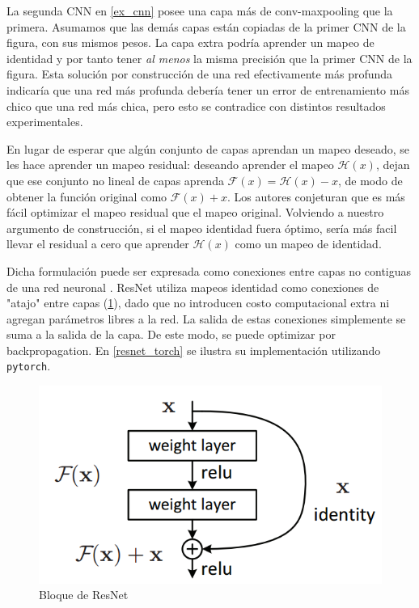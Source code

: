 \documentclass[titlepage,a4paper,oneside]{article}
\begin{document}
La segunda CNN en \ref{ex_cnn} posee una capa más de conv-maxpooling que la primera. Asumamos que las demás capas están copiadas de la primer CNN de la figura, con sus mismos pesos. La capa extra podría aprender un mapeo de identidad y por tanto tener \textit{al menos} la misma precisión que la primer CNN de la figura. Esta solución por construcción de una red efectivamente más profunda indicaría que una red más profunda debería tener un error de entrenamiento más chico que una red más chica, pero esto se contradice con distintos resultados experimentales.

En lugar de esperar que algún conjunto de capas aprendan un mapeo deseado, se les hace aprender un mapeo residual: deseando aprender el mapeo $\mathscr{H}(x)$, dejan que ese conjunto no lineal de capas aprenda $\mathscr{F}(x) = \mathscr{H}(x) - x$, de modo de obtener la función original como $\mathscr{F}(x) + x$. Los autores conjeturan que es más fácil optimizar el mapeo residual que el mapeo original. Volviendo a nuestro argumento de construcción, si el mapeo identidad fuera óptimo, sería más facil llevar el residual a cero que aprender $\mathscr{H}(x)$ como un mapeo de identidad.

Dicha formulación puede ser expresada como conexiones entre capas no contiguas de una red neuronal \cite{srivastava2015highway}. ResNet utiliza mapeos identidad como conexiones de "atajo" entre capas (\ref{resnet_block}), dado que no introducen costo computacional extra ni agregan parámetros libres a la red. La salida de estas conexiones simplemente se suma a la salida de la capa. De este modo, se puede optimizar por backpropagation. En \ref{resnet_torch} se ilustra su implementación utilizando \texttt{pytorch}.

\begin{figure}[H]
\centering
\includegraphics[scale=0.5]{images/resnet_block.png}
\caption{Bloque de ResNet}
\label{resnet_block}
\end{figure}
\end{document}
